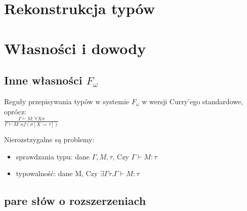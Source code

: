 \documentclass[11pt,leqno]{article}
\begin{document}
\section{Rekonstrukcja typów}


\section{Własności i dowody}
\setcounter{equation}{0}

\subsection{Inne własności $F_\omega$}

\begin{definicja}
Reguły przepisywania typów w systemie $F_{\omega}$ w wersji Curry'ego standardowe, oprócz: \\

$\frac{\Gamma \vdash M : \forall X \sigma}{\Gamma \vdash M : nf(\sigma [ X := \tau ])}$

\end{definicja}


Nierozstzygalne są problemy:
    \begin{itemize}
        \item sprawdzania typu: dane $\Gamma, M, \tau$, Czy $\Gamma \vdash M : \tau$
        \item typowalność: dane M, Czy $\exists \Gamma \tau . \Gamma \vdash M : \tau$
    \end{itemize}


\subsection{pare słów o rozszerzeniach}

\end{document}
